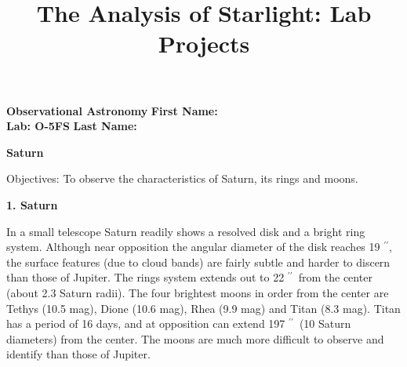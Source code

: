 \documentclass[12pt]{article}
\title{The Analysis of Starlight: Lab Projects}
\begin{document}
\setcounter{page}{1}
\setcounter{equation}{0}
\pagestyle{plain}
\thispagestyle{empty}  %
\newcommand{\kms}{\hbox{km\,s$^{\rm -1}$}}
\def\lo {\ifmmode {\,{\it L}\solar} \else $\,L$\solar\fi}       %
\def\my {\ifmmode {\,{\it M}\solar\,{\rm yr^{-1}}}              %
        \else {$\,M$\solar$\,$yr$^{\rm -1}$}\fi}
\def\BD {BD$\,$+30{\degr}3639}
\def\HUNO{\rm H$\,$I}                   %
\def\HDOS{\rm H$_2$}                    %
\def\arcsec{\ifmmode {^{\scriptscriptstyle\prime\prime}}
          \else $^{\scriptscriptstyle\prime\prime}$\fi}
\def\arcmin{\ifmmode {^{\scriptscriptstyle\prime}}
          \else $^{\scriptscriptstyle\prime}$\fi}
\def\deg{\ifmmode^\circ\else$^\circ$\fi}

\sloppy





\noindent
{\bf Observational Astronomy    \hfill} {\bf First Name: \makebox[4cm]{\hrulefill}}\\
{\bf Lab: O-5FS} \hfill {\bf Last Name: \makebox[4cm]{\hrulefill}}


\bigskip

\medskip

\noindent
{\hfill \Large {\bf Saturn} \hfill}


\bigskip

\noindent
{Objectives:} To observe the characteristics of Saturn, its rings and
moons.

\bigskip\noindent

\bigskip
\noindent
{\bf 1. Saturn }

\medskip
\noindent
In a small telescope Saturn readily shows a resolved disk and a bright
ring system. Although near opposition the angular diameter of the disk
reaches 19\arcsec, the surface features (due to cloud bands) are
fairly subtle and harder to discern than those of Jupiter. The rings
system extends out to 22\arcsec\  from the center (about 2.3 Saturn
radii). The four brightest moons in order from the center are Tethys
(10.5 mag), Dione (10.6 mag), Rhea (9.9 mag) and Titan (8.3
mag). Titan has a period of 16 days, and at opposition can extend
197\arcsec\ (10 Saturn diameters) from the center. The moons are much
more difficult to observe and identify than those of Jupiter.
 
\end{document}
